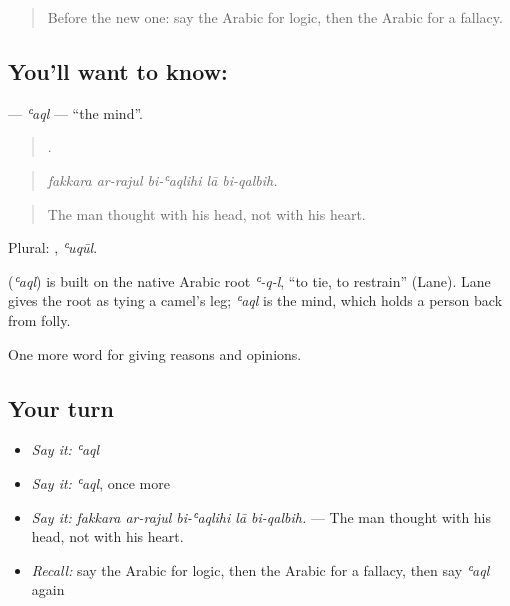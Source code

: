 \label{lesson:AR-C362-aql}



\begin{quote}
Before the new one: say the Arabic for logic, then the Arabic for a fallacy.
\end{quote}

\subsection*{You'll want to know: }
\textbf{} — \emph{ʿaql} — \textquotedblleft{}the mind\textquotedblright{}.

\begin{quote}
    .
\end{quote}

\begin{quote}
\emph{fakkara ar-rajul bi-ʿaqlihi lā bi-qalbih.}
\end{quote}

\begin{quote}
The man thought with his head, not with his heart.
\end{quote}

Plural: , \emph{ʿuqūl}.

\begin{cousinweb}
\textbf{} (\emph{ʿaql}) is built on the native Arabic root \emph{ʿ-q-l}, \textquotedblleft{}to tie, to restrain\textquotedblright{} (Lane). Lane gives the root as tying a camel's leg; \emph{ʿaql} is the mind, which holds a person back from folly.
\end{cousinweb}

\begin{grammarlens}[title={What you've built}]
One more word for giving reasons and opinions.
\end{grammarlens}

\subsection*{Your turn}
\begin{itemize}
\raggedright
  \item \emph{Say it:} \emph{ʿaql}
  \item \emph{Say it:} \emph{ʿaql}, once more
  \item \emph{Say it:} \emph{fakkara ar-rajul bi-ʿaqlihi lā bi-qalbih.} — The man thought with his head, not with his heart.
  \item \emph{Recall:} say the Arabic for logic, then the Arabic for a fallacy, then say \emph{ʿaql} again
\end{itemize}

